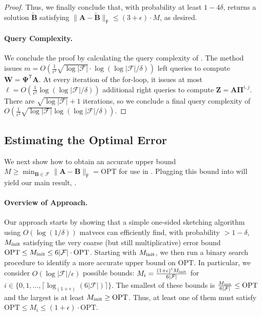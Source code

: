 \documentclass{article}[11pt]
\theoremstyle{definition}
\newcommand{\norm}[1]{\|#1\|}
\newcommand{\bv}[1]{\boldsymbol{\mathbf{#1}}}
\newcommand{\T}{\mathsf{T}}
\newcommand{\Fro}{\mathsf{F}}
\newcommand{\F}{\mathcal{F}}
\newcommand{\OPT}{\mathrm{OPT}}
\begin{document}
\begin{proof}
       Thus, we finally conclude that, with probability at least $1-4\delta$,  returns a solution $\bv{\tilde B}$ satisfying $\|\bv{A} - \bv{\tilde B}\|_\Fro \leq (3+\epsilon)\cdot M$, as desired.

       \paragraph{Query Complexity.} We conclude the proof by calculating the query complexity of . The method issues $m = O\left(\frac{1}{\epsilon^2}\sqrt{\log |\F|} \cdot \log(\log|\F|/\delta)\right)$ left queries to compute $\bv{W} = \bv{\Psi}^\T \bv{A}$. At every iteration of the for-loop, it issues at most $\ell = O\left(\frac{1}{\epsilon^2}\log(\log|\F|/\delta)\right)$ additional right queries to compute $\bv{Z} = \bv{A}\bv{\Pi}^{i,j}$. There are $\sqrt{\log |\F|} + 1$ iterations, so we conclude a final query complexity of $O\left(\frac{1}{\epsilon^2}\sqrt{\log |\F|}\log(\log|\F|/\delta)\right)$. 
    \end{proof}


\subsection{Estimating the Optimal Error}\label{sec:est}
We next show how to obtain an accurate upper bound $M \ge \min_{\bv B \in \F} \norm{\bv A - \bv B}_\Fro = \OPT$ for use in .   Plugging this bound into   will yield our main result, .

\paragraph{Overview of Approach.}
Our approach starts by showing that a simple one-sided sketching algorithm using $O(\log(1/\delta))$ matvecs can efficiently find, with probability $> 1-\delta$, $M_{\rm init}$ satisfying the very coarse (but still multiplicative) error bound $\OPT \le M_{\rm init} \le 6 |\mathcal F| \cdot \OPT$. 
%
Starting with $M_{\rm init}$, we then run a binary search procedure to identify a more accurate upper bound on $\OPT$. 
In particular, we consider $O(\log|\F|/\epsilon)$ possible bounds: $M_i = \frac{(1+\epsilon)^i M_{\rm init}}{6|\F|}$ for $i \in \{0, 1, \ldots, \lceil\log_{(1+\epsilon)}(6|\F|) \rceil\}$. The smallest of these bounds is $\frac{M_{\rm init}}{6|\F|} \le \OPT$ and the largest is at least  $M_{\rm init} \ge \OPT$. Thus, at least one of them  must satisfy $\OPT \le M_i \le (1+\epsilon) \cdot \OPT$.
\end{document}
